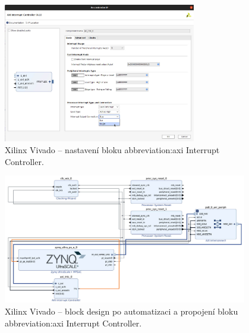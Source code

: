 \documentclass[a4paper, twoside, 11pt]{article}
\begin{document}
				\begin{figure}[htbp!]
					\centering
					\includegraphics[width=0.75\textwidth]{src/png/kr26-xilinx-vivado-flow/kr26-xilix-vivado-flow-10.jpg}
					\caption{Xilinx Vivado – nastavení bloku \gls{abbreviation:axi} Interrupt Controller.}
					\label{fig:kr26-xilix-vivado-flow-10}
				\end{figure}

				\begin{figure}[htbp!]
					\centering
					\includegraphics[width=0.95\textwidth]{src/png/kr26-xilinx-vivado-flow/kr26-xilix-vivado-flow-12.jpg}
					\caption{Xilinx Vivado – block design po automatizaci a propojení bloku \gls{abbreviation:axi} Interrupt Controller.}
					\label{fig:kr26-xilix-vivado-flow-12}
				\end{figure}
\end{document}
